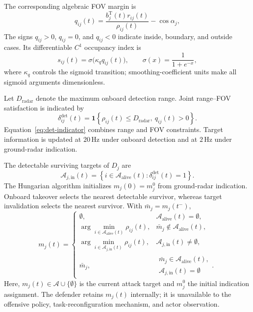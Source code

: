 \documentclass{cja}
\begin{document}
The corresponding algebraic FOV margin is
\begin{equation}
q_{ij}(t)
=
\frac{b_j^{\mathrm T}(t)r_{ij}(t)}
{\rho_{ij}(t)}
-\cos\alpha_j ,
\label{eq:qij-def}
\end{equation}
The signs $q_{ij}>0$, $q_{ij}=0$, and $q_{ij}<0$ indicate inside, boundary, and outside cases. Its differentiable $C^1$ occupancy index is
\begin{equation}
s_{ij}(t)
=
\sigma\!\bigl(\kappa_q q_{ij}(t)\bigr),\qquad
\sigma(x)=\frac{1}{1+e^{-x}},
\label{eq:sij-def}
\end{equation}
where $\kappa_q$ controls the sigmoid transition; smoothing-coefficient units make all sigmoid arguments dimensionless.

Let $D_{\mathrm{radar}}$ denote the maximum onboard detection range. Joint range--FOV satisfaction is indicated by
\begin{equation}
\delta_{ij}^{\mathrm{det}}(t)
=
\mathbf{1}
\left\{
\rho_{ij}(t)\le D_{\mathrm{radar}},\
q_{ij}(t)>0
\right\}.
\label{eq:det-indicator}
\end{equation}
Equation~\eqref{eq:det-indicator} combines range and FOV constraints. Target information is updated at $20\,\mathrm{Hz}$ under onboard detection and at $2\,\mathrm{Hz}$ under ground-radar indication.

The detectable surviving targets of $D_j$ are
\begin{equation}
\mathcal A_{j,\mathrm{in}}(t)
=
\left\{
i\in\mathcal A_{\mathrm{alive}}(t):
\delta_{ij}^{\mathrm{det}}(t)=1
\right\}.
\label{eq:in-detect-set}
\end{equation}
The Hungarian algorithm initializes $m_j(0)=m_j^0$ from ground-radar indication. Onboard takeover selects the nearest detectable survivor, whereas target invalidation selects the nearest survivor. With $\bar m_j=m_j(t^-)$,
\begin{equation}
m_j(t)=
\begin{cases}
\emptyset,
& \mathcal A_{\mathrm{alive}}(t)=\emptyset,\\[1mm]
\displaystyle \arg\min_{i\in \mathcal A_{\mathrm{alive}}(t)}
\rho_{ij}(t),
& \bar m_j\notin \mathcal A_{\mathrm{alive}}(t),\\[3mm]
\displaystyle \arg\min_{i\in \mathcal A_{j,\mathrm{in}}(t)}
\rho_{ij}(t),
& \mathcal A_{j,\mathrm{in}}(t)\neq\emptyset,\\[3mm]
\bar m_j,
& \substack{\bar m_j\in \mathcal A_{\mathrm{alive}}(t),\\
\mathcal A_{j,\mathrm{in}}(t)=\emptyset}.
\end{cases}
\label{eq:fov-lock-rule}
\end{equation}
Here, $m_j(t)\in\mathcal A\cup\{\emptyset\}$ is the current attack target and $m_j^0$ the initial indication assignment. The defender retains $m_j(t)$ internally; it is unavailable to the offensive policy, task-reconfiguration mechanism, and actor observation.
\end{document}
